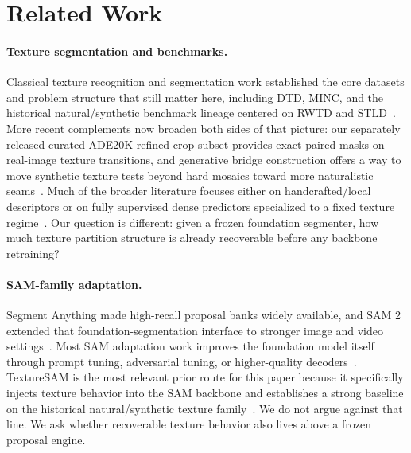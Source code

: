 \section{Related Work}
\label{sec:related}

\paragraph{Texture segmentation and benchmarks.} Classical texture recognition and segmentation work established the core datasets and problem structure that still matter here, including DTD, MINC, and the historical natural/synthetic benchmark lineage centered on RWTD and STLD~\cite{cimpoi2014dtd,bell2015minc,cimpoi2016deepfilterbanks,khan2015stld,khan2017c2f,khan2018learnedstld,mikes2022texturebenchmark}. More recent complements now broaden both sides of that picture: our separately released curated ADE20K refined-crop subset provides exact paired masks on real-image texture transitions, and generative bridge construction offers a way to move synthetic texture tests beyond hard mosaics toward more naturalistic seams~\cite{detextureade20k2026}. Much of the broader literature focuses either on handcrafted/local descriptors or on fully supervised dense predictors specialized to a fixed texture regime~\cite{andrearczyk2017texturefcn,liu2019bowtocnn}. Our question is different: given a frozen foundation segmenter, how much texture partition structure is already recoverable before any backbone retraining?

\paragraph{SAM-family adaptation.} Segment Anything made high-recall proposal banks widely available, and SAM 2 extended that foundation-segmentation interface to stronger image and video settings~\cite{kirillov2023sam,ravi2024sam2}. Most SAM adaptation work improves the foundation model itself through prompt tuning, adversarial tuning, or higher-quality decoders~\cite{ke2023hqsam,zhang2023persam,li2024asam}. TextureSAM is the most relevant prior route for this paper because it specifically injects texture behavior into the SAM backbone and establishes a strong baseline on the historical natural/synthetic texture family~\cite{cohen2025texturesam,cohen2026texturesam}. We do not argue against that line. We ask whether recoverable texture behavior also lives above a frozen proposal engine.


